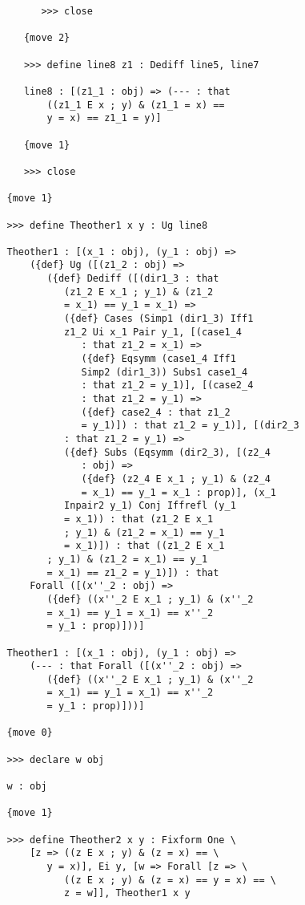 \documentclass[12pt]{article}
\begin{document}
\begin{verbatim}
         >>> close

      {move 2}

      >>> define line8 z1 : Dediff line5, line7

      line8 : [(z1_1 : obj) => (--- : that 
          ((z1_1 E x ; y) & (z1_1 = x) == 
          y = x) == z1_1 = y)]

      {move 1}

      >>> close

   {move 1}

   >>> define Theother1 x y : Ug line8

   Theother1 : [(x_1 : obj), (y_1 : obj) => 
       ({def} Ug ([(z1_2 : obj) => 
          ({def} Dediff ([(dir1_3 : that 
             (z1_2 E x_1 ; y_1) & (z1_2 
             = x_1) == y_1 = x_1) => 
             ({def} Cases (Simp1 (dir1_3) Iff1 
             z1_2 Ui x_1 Pair y_1, [(case1_4 
                : that z1_2 = x_1) => 
                ({def} Eqsymm (case1_4 Iff1 
                Simp2 (dir1_3)) Subs1 case1_4 
                : that z1_2 = y_1)], [(case2_4 
                : that z1_2 = y_1) => 
                ({def} case2_4 : that z1_2 
                = y_1)]) : that z1_2 = y_1)], [(dir2_3 
             : that z1_2 = y_1) => 
             ({def} Subs (Eqsymm (dir2_3), [(z2_4 
                : obj) => 
                ({def} (z2_4 E x_1 ; y_1) & (z2_4 
                = x_1) == y_1 = x_1 : prop)], (x_1 
             Inpair2 y_1) Conj Iffrefl (y_1 
             = x_1)) : that (z1_2 E x_1 
             ; y_1) & (z1_2 = x_1) == y_1 
             = x_1)]) : that ((z1_2 E x_1 
          ; y_1) & (z1_2 = x_1) == y_1 
          = x_1) == z1_2 = y_1)]) : that 
       Forall ([(x''_2 : obj) => 
          ({def} ((x''_2 E x_1 ; y_1) & (x''_2 
          = x_1) == y_1 = x_1) == x''_2 
          = y_1 : prop)]))]

   Theother1 : [(x_1 : obj), (y_1 : obj) => 
       (--- : that Forall ([(x''_2 : obj) => 
          ({def} ((x''_2 E x_1 ; y_1) & (x''_2 
          = x_1) == y_1 = x_1) == x''_2 
          = y_1 : prop)]))]

   {move 0}

   >>> declare w obj

   w : obj

   {move 1}

   >>> define Theother2 x y : Fixform One \
       [z => ((z E x ; y) & (z = x) == \
          y = x)], Ei y, [w => Forall [z => \
             ((z E x ; y) & (z = x) == y = x) == \
             z = w]], Theother1 x y


\end{verbatim}
\end{document}
